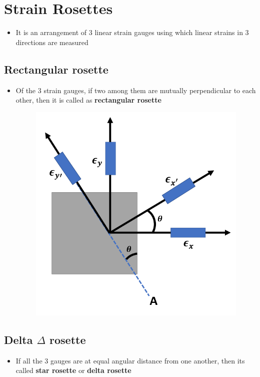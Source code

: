 \documentclass[8pt]{report}
\begin{document}
	\section{Strain Rosettes}
		\begin{itemize}
			\item It is an arrangement of 3 linear strain gauges using which linear strains in 3 directions are measured
		\end{itemize}\hrulefill
		\subsection{Rectangular rosette}
			\begin{itemize}
				\item Of the 3 strain gauges, if two among them are mutually perpendicular to each other, then it is called as \textbf{rectangular rosette}
				\begin{figure}[H]
					\centering
					\includegraphics[scale=0.4]{rectangular_rosette.png}
				\end{figure}
			\end{itemize}\hrulefill
	\subsection{Delta $\Delta$ rosette}
		\begin{itemize}
			\item If all the 3 gauges are at equal angular distance from one another, then its called \textbf{star rosette} or \textbf{delta rosette}
		\end{itemize}\hrulefill
\end{document}
